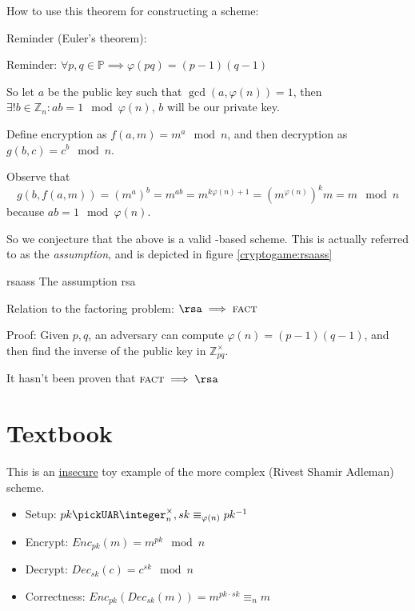 How to use this theorem for constructing a \pke{} scheme:

Reminder (Euler's theorem):

Reminder: $\forall p, q \in \mathbb{P} \implies \varphi(pq) = (p-1)(q-1)$

So let $a$ be the public key such that $\gcd(a, \varphi(n))=1$, then $\exists! b
\in \mathbb{Z}_n : ab = 1 \mod \varphi(n)$, $b$ will be our private key.

Define encryption as $f(a, m) = m^a \mod n$, and then decryption as $g(b, c) =
c^b \mod n$.

Observe that 
\[
    g(b, f(a, m)) = (m^a)^b =m^{ab}=m^{k\varphi(n)+1}=(m^{\varphi(n)})^{k}m = m \mod n
\]
because $ab = 1 \mod \varphi(n)$.

So we conjecture that the above is a valid \tdp-based \pke{} scheme. This is actually referred to as the \emph{\rsa{} assumption}, and is depicted in figure \ref{cryptogame:rsaass}

\begin{cryptogame}
    {rsaass}
    {The \rsa{} assumption}
    {rsa}


    \cseqdelay


\end{cryptogame}


Relation to the factoring problem: $\rsa \implies \textsc{fact}$

Proof: Given $p, q$, an adversary can compute $\varphi(n) = (p-1)(q-1)$, and then find the inverse of the public key in $\mathbb{Z}_{pq}^\times$.

It hasn't been proven that $\textsc{fact} \implies \rsa$


\section{Textbook \rsa}
This is an \underline{insecure} toy example of the more complex \rsa{} (Rivest Shamir Adleman) scheme.

\begin{itemize}
    \item Setup: $pk \pickUAR \integer_n^\times, sk \equiv_{\varphi(n)} pk^{-1}$
    \item Encrypt: $Enc_{pk}(m) = m^{pk} \mod{n}$
    \item Decrypt: $Dec_{sk}(c) = c^{sk} \mod{n}$
    \item Correctness: $Enc_{pk}(Dec_{sk}(m)) = m^{pk \cdot sk} \equiv_n m$
\end{itemize}

